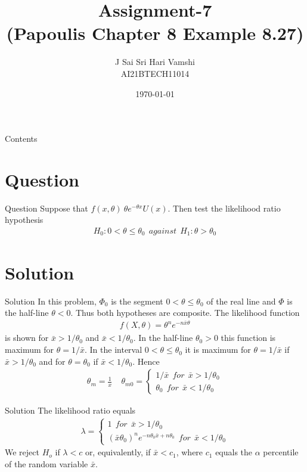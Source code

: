 \documentclass{beamer}
\title{Assignment-7\\(Papoulis Chapter 8 Example 8.27)}
\author{J Sai Sri Hari Vamshi\\ AI21BTECH11014}
\date{\today}
\begin{document}
\begin{frame}
    \titlepage 
\end{frame}



\begin{frame}{Contents}
    \tableofcontents
\end{frame}

\section{Question}
\begin{frame}{Question}
	Suppose that $f(x, \theta) ~ \theta e^{-\theta x} U(x)$. Then test the likelihood ratio hypothesis \\
	\begin{align*}
	H_0:0<\theta\leq\theta_0 \ \ against \ \ H_1:\theta>\theta_0
	\end{align*}
\end{frame}

\section{Solution}

\begin{frame}{Solution}
In this problem, $\Phi_0$ is the segment $0 < \theta \leq \theta_0 $ of the real line and $\Phi$ is the half-line
    $\theta < 0$. Thus both hypotheses are composite. The likelihood function
    \begin{align}
        f(X,\theta) = \theta^n e^{-n\bar{x}\theta} 
    \end{align}
    is shown for $\bar{x} > 1/\theta_0$ and $\bar{x} < 1/\theta_0$. In the half-line $\theta_0 > 0$ this function
    is maximum for $\theta = 1/\bar{x}$. In the interval $0 < \theta \leq \theta_0$ it is maximum for $\theta = 1/\bar{x}$ if
    $\bar{x}> 1/\theta_0$ and for $\theta = \theta_0$ if $\bar{x} < 1/\theta_0$. Hence
    \begin{align}
      \theta_m = \frac{1}{x} ~~~~~ \theta_{m0}= \begin{cases}
        1/\bar{x} ~~for ~~\bar{x} > 1/\theta_0\\
        \theta_0 ~~for ~~\bar{x} < 1/\theta_0
      \end{cases}
    \end{align}
\end{frame}

\begin{frame}{Solution}
    The likelihood ratio equals
    \begin{align}
      \lambda = \begin{cases}
        1 ~~for ~~\bar{x} > 1/\theta_0\\
        (\bar{x}\theta_0)^ne^{-n\theta_0\bar{x}+n\theta_0}~~for ~~\bar{x} < 1/\theta_0
      \end{cases}
    \end{align}
    We reject $H_o$ if $\lambda < c$ or, equivalently, if $\bar{x} < c_1$, where $c_1$ equals the $\alpha$ percentile of the
    random variable $\bar{x}$. 
\end{frame}
\end{document}
